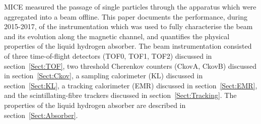 MICE measured the passage of single particles through the apparatus which were aggregated into
a beam offline.
This paper documents the performance, during 2015-2017, of the instrumentation which was used to fully
characterise the beam and its evolution along the magnetic channel,
and quantifies the physical properties of the liquid hydrogen absorber.
The beam instrumentation consisted of three time-of-flight detectors
(TOF0, TOF1, TOF2) discussed in section~\ref{Sect:TOF}, two 
threshold Cherenkov counters (CkovA, CkovB) discussed in
section~\ref{Sect:Ckov}, a sampling calorimeter (KL) discussed in
section~\ref{Sect:KL}, a tracking calorimeter (EMR) discussed in
section~\ref{Sect:EMR}, and the scintillating-fibre trackers discussed in section~\ref{Sect:Tracking}.
The properties of the liquid hydrogen
absorber are described in section~\ref{Sect:Absorber}.
